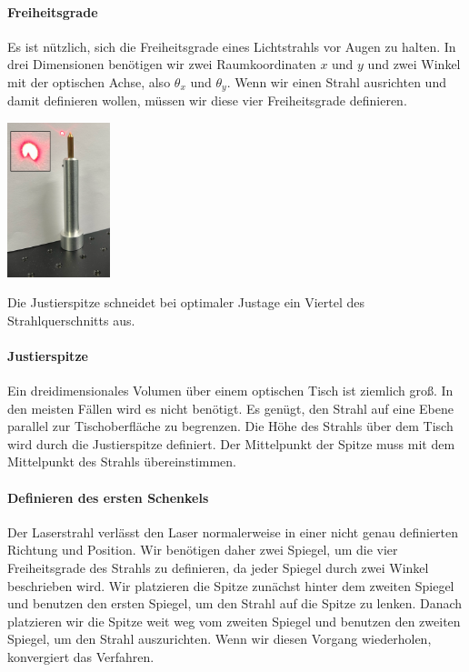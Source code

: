 \paragraph*{Freiheitsgrade} Es ist nützlich, sich die Freiheitsgrade eines Lichtstrahls vor Augen zu halten.  In drei Dimensionen benötigen wir zwei Raumkoordinaten $x$ und $y$ und zwei Winkel mit der optischen Achse, also $\theta_x$ und $\theta_y$. Wenn wir einen Strahl ausrichten und damit definieren wollen, müssen wir diese vier Freiheitsgrade definieren.

\begin{marginfigure}
	\includegraphics*[width=30mm]{bilder/justierspitze.png}
	\caption{Die Justierspitze schneidet bei optimaler Justage ein Viertel des Strahlquerschnitts aus. }
\end{marginfigure}

\paragraph*{Justierspitze} Ein dreidimensionales Volumen über einem optischen Tisch ist ziemlich groß. In den meisten Fällen wird es nicht benötigt. Es genügt, den Strahl auf eine Ebene parallel zur Tischoberfläche zu begrenzen. Die Höhe des Strahls über dem Tisch wird durch die Justierspitze definiert. Der Mittelpunkt der Spitze muss mit dem Mittelpunkt des Strahls übereinstimmen.

\paragraph*{Definieren des ersten Schenkels} Der Laserstrahl verlässt den Laser normalerweise in einer nicht genau definierten Richtung und Position. Wir benötigen daher zwei Spiegel, um die vier Freiheitsgrade des Strahls zu definieren, da jeder Spiegel durch zwei Winkel beschrieben wird. Wir platzieren die Spitze zunächst hinter dem zweiten Spiegel und benutzen den ersten Spiegel, um den Strahl auf die Spitze zu lenken. Danach platzieren wir die Spitze weit weg vom zweiten Spiegel und benutzen den zweiten Spiegel, um den Strahl auszurichten. Wenn wir diesen Vorgang wiederholen, konvergiert das Verfahren.


